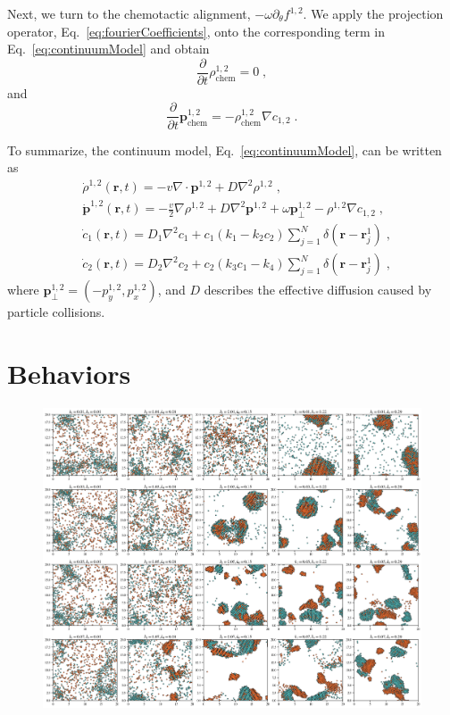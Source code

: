 \documentclass{article}
\begin{document}
Next, we turn to the chemotactic alignment, $-\omega \partial _{\theta}f^{1,2}$. We apply the projection operator, Eq.~\eqref{eq:fourierCoefficients}, onto the corresponding term in Eq.~\eqref{eq:continuumModel} and obtain
\begin{equation}
    \frac{\partial}{\partial t}\rho _{\mathrm{chem}}^{1,2}=0\;,
\end{equation}
and
\begin{equation}
    \frac{\partial}{\partial t}\boldsymbol{p}_{\mathrm{chem}}^{1,2}=-\rho _{\mathrm{chem}}^{1,2}\nabla c_{1,2}\;.
\end{equation}

To summarize, the continuum model, Eq.~\eqref{eq:continuumModel}, can be written as
\begin{subequations}
    \begin{align}
        &\dot{\rho}^{1,2}\left( \mathbf{r},t \right) =-v\nabla \cdot \boldsymbol{p}^{1,2}+D\nabla ^2\rho ^{1,2}\;,\\
        &\dot{\boldsymbol{p}}^{1,2}\left( \mathbf{r},t \right) =-\frac{v}{2}\nabla \rho ^{1,2}+D\nabla ^2\boldsymbol{p}^{1,2}+\omega \boldsymbol{p}_{\bot}^{1,2}-\rho ^{1,2}\nabla c_{1,2}\;,\\
        &\dot{c}_1\left( \mathbf{r},t \right) =D_1\nabla ^2c_1+c_1\left( k_1-k_2c_2 \right) \sum_{j=1}^N{\delta \left( \mathbf{r}-\mathbf{r}_{j}^{1} \right) \;,}\\
        &\dot{c}_2\left( \mathbf{r},t \right) =D_2\nabla ^2c_2+c_2\left( k_3c_1-k_4 \right) \sum_{j=1}^N{\delta \left( \mathbf{r}-\mathbf{r}_{j}^{1} \right) \;,}
    \end{align}
\end{subequations}
where $\boldsymbol{p}_{\bot}^{1,2}=\left( -p_{y}^{1,2},p_{x}^{1,2} \right)$, and $D$ describes the effective diffusion caused by particle collisions.

\section{Behaviors}
\begin{figure}[H]
    \centering
    \includegraphics[width=\textwidth]{figs/bigGraphParticle_k23_0.5.png}
\end{figure}

% 
\end{document}
